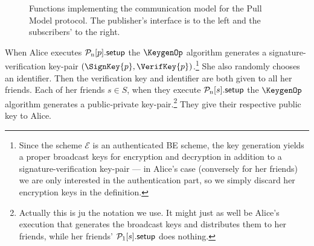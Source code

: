 \begin{figure}%
  \caption{%
    Functions implementing the communication model for the Pull Model protocol.
    The publisher's interface is to the left and the subscribers' to the right.
  }\label{PullFunctions}
\end{figure}

When Alice executes \(\pnsetup{p}\) the \(\KeygenOp\) algorithm generates 
a signature-verification key-pair \((\SignKey{p}, \VerifKey{p})\).\footnote{%
  Since the scheme \(\mathcal{E}\) is an authenticated \ac{BE} scheme, the key 
  generation yields a proper broadcast keys for encryption and decryption in 
  addition to a signature-verification key-pair --- in Alice's case (conversely 
  for her friends) we are only interested in the authentication part, so we 
  simply discard her encryption keys in the definition.
}
She also randomly chooses an identifier.
Then the verification key and identifier are both given to all her friends.
Each of her friends \(s\in S\), when they execute \(\pnsetup{s}\) the 
\(\KeygenOp\) algorithm generates a public-private key-pair.\footnote{%
  Actually this is ju the notation we use.
  It might just as well be Alice's execution that generates the broadcast keys 
  and distributes them to her friends, while her friends' \(\psetup{s}\) does 
  nothing.
}
They give their respective public key to Alice.


